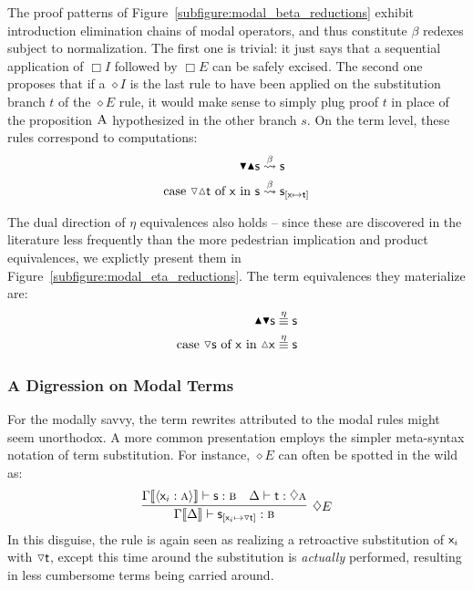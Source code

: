 The proof patterns of Figure~\ref{subfigure:modal_beta_reductions} exhibit introduction elimination chains of modal operators, and thus constitute $\beta$ redexes subject to normalization.
The first one is trivial: it just says that a sequential application of $\Box I$ followed by $\Box E$ can be safely excised.
The second one proposes that if a $\diamond I$ is the last rule to have been applied on the substitution branch $t$ of the $\diamond E$ rule, it would make sense to simply plug proof $t$ in place of the proposition $\normalfont\textsc{A}$ hypothesized in the other  branch $s$.
On the term level, these rules correspond to computations:
\begin{align}
\boxelim \boxintro \term{s} & \bred \term{s}\\
\cterm{case \term{\diaelim \diaintro t} of \term{x} in \term{s}} & \bred \term{s}_{[\term{x} \mapsto \term{t}]}
\end{align}

The dual direction of $\eta$ equivalences also holds -- since these are discovered in the literature less frequently than the more pedestrian implication and product equivalences, we explictly present them in Figure~\ref{subfigure:modal_eta_reductions}.
The term equivalences they materialize are:
\begin{align}
\boxintro \boxelim \term{s} & \overset{\eta}{\equiv} \term{s}\\
\cterm{case \term{\diaelim{s}} of \term{x} in \term{\diaintro{x}}} & \overset{\eta}{\equiv} \term{s}
\end{align}

\subsubsection{A Digression on Modal Terms}
For the modally savvy, the term rewrites attributed to the modal rules might seem unorthodox.
A more common presentation employs the simpler meta-syntax notation of term substitution.
For instance, $\diamond E$ can often be spotted in the wild as:
\[
	\infer[\diamond E]{\Gamma\ctx{\Delta} \vdash \term{s}_{[\term{\vari }\mapsto\term{\diaelim t}]}: \prop{b}}{
		\Gamma\ctx{\bracket{\term{\vari }:\prop{a}}}\vdash\term{s}:\prop{b}
		&
		\Delta \vdash \term{t}:\diamond\prop{a}
	}
\]
In this disguise, the rule is again seen as realizing a retroactive substitution of $\mathsf{\mathsf{x}_{\mathnormal{i}} }$ with $\smallterm{\diaelim t}$, except this time around the substitution is \textit{actually} performed, resulting in less cumbersome terms being carried around.

